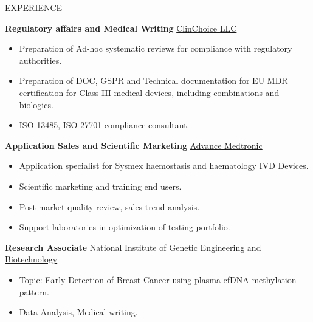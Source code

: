 \documentclass{resume}
\begin{document}
\begin{rSection}{EXPERIENCE}
\vspace{-1.25em}
\item \textbf{Regulatory affairs and Medical Writing} \hfill \href{https://clinchoice.com/solutions/medical-device-regulatory-affairs/technical-document-submission-approval-preparation/}{ClinChoice LLC}
\begin{itemize}
    \itemsep -3pt {}
    \item Preparation of Ad-hoc systematic reviews for compliance with regulatory authorities.
     \item Preparation of DOC, GSPR and Technical documentation for EU MDR certification for Class III medical devices, including combinations and biologics.
     \item ISO-13485, ISO 27701 compliance consultant.
 \end{itemize}

\item \textbf{Application Sales and Scientific Marketing} \hfill {\href{https://www.sysmex-europe.com/products/diagnostics/haemostasis.html}{Advance Medtronic}}
\begin{itemize}
    \itemsep -3pt {} 
     \item Application specialist for Sysmex haemostasis and haematology IVD Devices.
     \item Scientific marketing and training end users.
     \item Post-market quality review, sales trend analysis.
     \item Support laboratories in optimization of testing portfolio.
 \end{itemize}
\item \textbf{Research Associate} \hfill \href{http://www.nigeb.ac.ir/web/en}{National Institute of Genetic Engineering and Biotechnology}
\begin{itemize}
    \itemsep -3pt {} 
     \item Topic: Early Detection of Breast Cancer using plasma cfDNA methylation pattern.
     \item Data Analysis, Medical writing.
 \end{itemize}
\end{rSection} 
\end{document}
